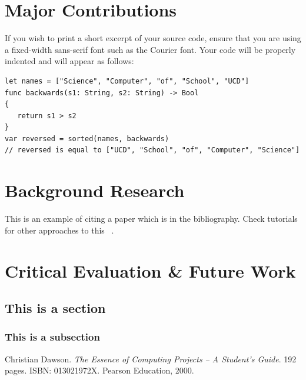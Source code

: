 \documentclass[]{UCD_CS_47360_Report}
\begin{document}
\chapter{\label{chapter6} Major Contributions}
If you wish to print a short excerpt of your source code,  ensure that you are using a fixed-width sans-serif font such as the Courier font. Your code will be properly indented and will appear as follows:

\begin{verbatim}
let names = ["Science", "Computer", "of", "School", "UCD"]
func backwards(s1: String, s2: String) -> Bool
{
   return s1 > s2
}
var reversed = sorted(names, backwards)
// reversed is equal to ["UCD", "School", "of", "Computer", "Science"]
\end{verbatim}

\chapter{\label{chapter7} Background Research}
This is an example of citing a paper which is in the bibliography. Check tutorials for other approaches to this ~\cite{DAWSON:2000}.



\chapter{\label{chapter8} Critical Evaluation & Future Work}
\section{This is a section}
\subsection{This is a subsection}




\newpage
\begin{thebibliography}{99}
 Christian Dawson. \emph{The Essence of Computing Projects -- A Student's Guide}. 192 pages. ISBN: 013021972X. Pearson Education, 2000.
\end{thebibliography}
\label{endpage}
\end{document}
